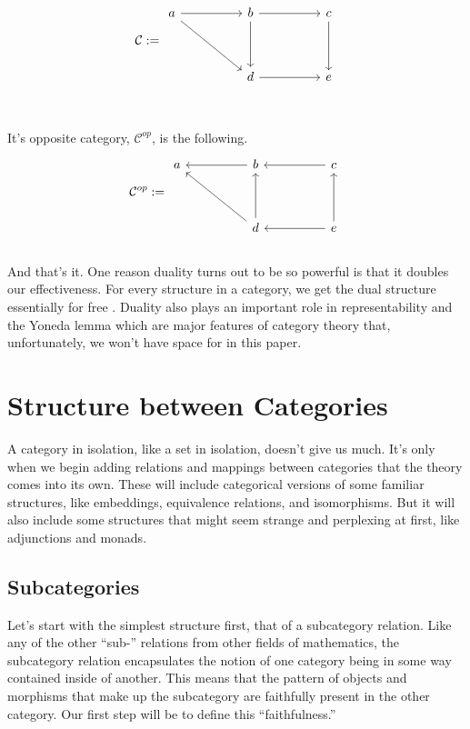 \documentclass[12pt]{article}
\begin{document}
\[\mathcal{C} := \begin{tikzcd}
        a && b && c \\
        \\
        && d && e
        \arrow[from=1-1, to=1-3]
        \arrow[from=1-1, to=3-3]
        \arrow[from=1-3, to=3-3]
        \arrow[from=3-3, to=3-5]
        \arrow[from=1-3, to=1-5]
        \arrow[from=1-5, to=3-5]
    \end{tikzcd}\]
\\\\It's opposite category, $\mathcal{C}^{op}$, is the following.
\[\mathcal{C}^{op} := \begin{tikzcd}
        a && b && c \\
        \\
        && d && e
        \arrow[from=1-3, to=1-1]
        \arrow[from=3-3, to=1-1]
        \arrow[from=3-3, to=1-3]
        \arrow[from=3-5, to=3-3]
        \arrow[from=1-5, to=1-3]
        \arrow[from=3-5, to=1-5]
    \end{tikzcd}\]
\\
And that's it.
One reason duality turns out to be so powerful is that it doubles our effectiveness.
For every structure in a category, we get the dual structure essentially for free \cite{cheng2022joy}.
Duality also plays an important role in representability and the Yoneda lemma which are major features of category theory that, unfortunately, we won't have space for in this paper.








\section*{Structure between Categories}
A category in isolation, like a set in isolation, doesn't give us much.
It's only when we begin adding relations and mappings between categories that the theory comes into its own.
These will include categorical versions of some familiar structures, like embeddings, equivalence relations, and isomorphisms.
But it will also include some structures that might seem strange and perplexing at first, like adjunctions and monads.


\subsection*{Subcategories}
Let's start with the simplest structure first, that of a subcategory relation.
Like any of the other ``sub-'' relations from other fields of mathematics, the subcategory relation encapsulates the notion of one category being in some way contained inside of another.
This means that the pattern of objects and morphisms that make up the subcategory are faithfully present in the other category.
Our first step will be to define this ``faithfulness.''
\end{document}
